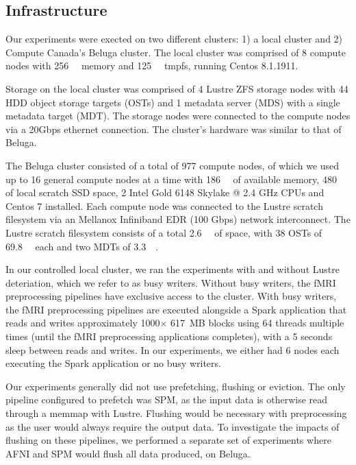     
    \subsection{Infrastructure}
    
    Our experiments were exected on two different clusters: 1) a local cluster
    and 2) Compute Canada's Beluga cluster. The local cluster was comprised of 8
    compute nodes with \SI{256}{\gibi\byte} memory and \SI{125}{\gibi\byte}
    tmpfs, running Centos 8.1.1911.
    
    Storage on the local cluster was comprised of 4 Lustre ZFS storage nodes
    with 44 HDD object storage targets (OSTs) and 1 metadata server  (MDS) with
    a single metadata target (MDT). The storage nodes were connected to the
    compute nodes via a 20Gbps ethernet connection. The cluster's hardware was
    similar to that of Beluga.
    
    The Beluga cluster consisted of a total of 977 compute nodes, of which we
    used up to 16 general compute nodes at a time with \SI{186}{\gibi\byte} of
    available memory, \SI{480}{\gibi\byte} of local scratch SSD space, 2 Intel Gold
    6148 Skylake @ 2.4 GHz CPUs and Centos 7 installed. Each compute node was
    connected to the Lustre scratch filesystem via an Mellanox Infiniband EDR
    (100 Gbps) network interconnect. The Lustre scratch filesystem consists of a
    total \SI{2.6}{\pebi\byte} of space, with 38 OSTs of \SI{69.8}{\tebi\byte}
    each and two MDTs of \SI{3.3}{\tebi\byte}.

    In our controlled local cluster, we ran the experiments with and without
    Lustre deteriation, which we refer to as busy writers. Without busy writers,
    the fMRI preprocessing pipelines have exclusive access to the cluster. With
    busy writers, the fMRI preprocessing pipelines are executed alongside a
    Spark application that reads and writes approximately 1000$\times$ 617~MB
    blocks using 64 threads multiple times (until the fMRI preprocessing
    applications completes), with a 5 seconds sleep between reads and writes. In
    our experiments, we either had 6 nodes each executing the Spark application
    or no busy writers.

    Our experiments generally did not use prefetching, flushing or eviction. The only
    pipeline configured to prefetch was SPM, as the input data is otherwise read through
    a memmap with Lustre. Flushing would be necessary with preprocessing as the user would always
    require the output data. To investigate the impacts of flushing on these pipelines, we performed
    a separate set of experiments where AFNI and SPM would flush all data produced, on Beluga.

